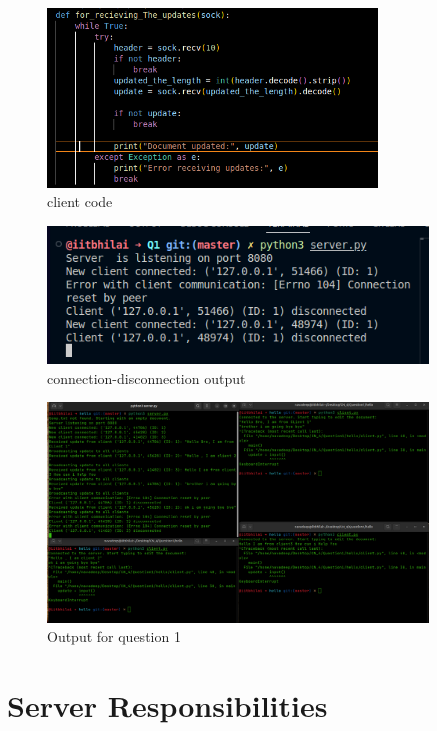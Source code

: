 \documentclass{exam}
\begin{document}
\begin{figure}[H]
    \centering
    \includegraphics[width=0.78\textwidth]{update_Receive.png } 
    \caption{client code}
    \label{fig:output1}
\end{figure}

\begin{figure}[H]
    \centering
    \includegraphics[width=0.9\textwidth]{Q1_connection.png } 
    \caption{connection-disconnection output}
    \label{fig:output1}
\end{figure}

\begin{figure}[H]
    \centering
\includegraphics[width=0.9\textwidth]{Q1output.png } 
    \caption{Output for question 1}
    \label{fig:output1}
\end{figure}


\section*{Server Responsibilities}
\end{document}
